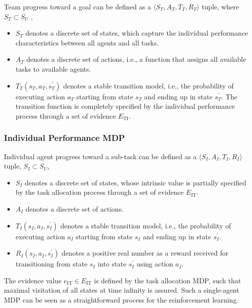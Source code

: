 \documentclass[compsoc,journal,letterpaper,10pt,draftcls,twocolumn]{IEEEtran}
\begin{document}
Team progress toward a goal can be defined as a
\( \langle S_{T}, A_{T}, T_{T}, R_{T} \rangle \) tuple, where\(S_{T} \subset S_{U}\) ,

\begin{itemize}
\item
  \(S_{T}\) denotes a discrete set of states, which capture the
  individual performance characteristics between all agents and all
  tasks.
\item
  \(A_{T}\) denotes a discrete set of actions, i.e., a function that
  assigns all available tasks to available agents.
\item
  \(T_{T}\left( s_{T}, a_{T}, s_{T}^{\prime} \right)\) denotes a stable
  transition model, i.e., the probability of executing action \(a_{T}\)
  starting from state \(s_{T}\) and ending up in state \(s_{T}^{\prime}\).
  The transition function is completely specified by the individual
  performance process through a set of evidence \(E_{\text{TI}}\).
\end{itemize}

\subsubsection{Individual Performance
MDP}\label{individual-performance-mdp}

Individual agent progress toward a sub-task can be defined as a
\( \langle S_{I}, A_{I}, T_{I}, R_{I} \rangle \) tuple, \(S_{I} \subset S_{U}\),

\begin{itemize}
\item
  \(S_{I}\) denotes a discrete set of states, whose intrinsic value is
  partially specified by the task allocation process through a set of
  evidence \(E_{\text{IT}}\).
\item
  \(A_{I}\) denotes a discrete set of actions.
\item
  \(T_{I}\left( s_{I}, a_{I}, s_{I}^{\prime} \right)\) denotes a stable
  transition model, i.e., the probability of executing action \(a_{I}\)
  starting from state \(s_{I}\) and ending up in state \(s_{I}^{\prime}\).
\item
  \(R_{I}(s_{I},a_{I},s_{I}^{\prime})\) denotes a positive real number as a
  reward received for transitioning from state \(s_{I}\) into state
  \(s_{I}^{\prime}\) using action \(a_{I}\).
\end{itemize}

The evidence value \(e_{\text{IT}} \in E_{\text{IT}}\) is defined by
the task allocation MDP, such that maximal visitation of all states at
time infinity is assured. Such a single-agent MDP can be seen as a
straightforward process for the reinforcement learning.
\end{document}
